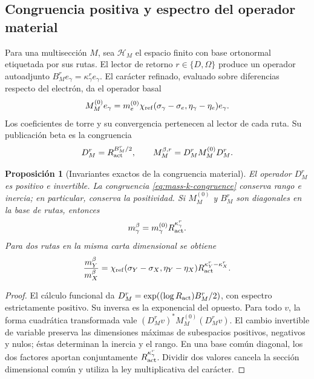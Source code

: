 \documentclass[a4paper,10pt]{article}
\newtheorem{proposition}[theorem]{Proposición}
\theoremstyle{definition}\newtheorem{definition}[theorem]{Definición}
\theoremstyle{remark}\newtheorem{remark}[theorem]{Observación}
\numberwithin{equation}{section}
\begin{document}
\subsection{Congruencia positiva y espectro del operador material}

Para una multisección \(M\), sea \(\mathscr H_M\) el espacio finito
con base ortonormal etiquetada por sus rutas. El lector de retorno
\(r\in\{D,\Omega\}\) produce un operador autoadjunto
\(B_M^r e_\gamma=\kappa_\gamma^r e_\gamma\). El carácter refinado,
evaluado sobre diferencias respecto del electrón, da el operador basal
\[
 M_M^{(0)}e_\gamma=
 m_e^{(0)}\chi_{\rm ref}(\sigma_\gamma-\sigma_e,
                  \eta_\gamma-\eta_e)e_\gamma.
\]
Los coeficientes de torre y su convergencia pertenecen al lector de cada
ruta. Su publicación beta es la congruencia
\begin{equation}
 D_M^r=R_{\rm act}^{B_M^r/2},\qquad
 M_M^{\beta,r}=D_M^rM_M^{(0)}D_M^r.
 \label{eq:mass-k-congruence}
\end{equation}

\begin{proposition}[Invariantes exactos de la congruencia material]
El operador \(D_M^r\) es positivo e invertible. La congruencia
\eqref{eq:mass-k-congruence} conserva rango e inercia; en particular,
conserva la positividad. Si \(M_M^{(0)}\) y \(B_M^r\) son diagonales
en la base de rutas, entonces
\[
 m_\gamma^\beta=m_\gamma^{(0)}R_{\rm act}^{\kappa_\gamma^r}.
\]
Para dos rutas en la misma carta dimensional se obtiene
\[
 \frac{m_Y^\beta}{m_X^\beta}=
 \chi_{\rm ref}(\sigma_Y-\sigma_X,\eta_Y-\eta_X)
 R_{\rm act}^{\kappa_Y^r-\kappa_X^r}.
\]
\end{proposition}
\begin{proof}
El cálculo funcional da
\(D_M^r=\exp((\log R_{\rm act})B_M^r/2)\), con espectro
estrictamente positivo. Su inversa es la exponencial del opuesto.
Para todo \(v\), la forma cuadrática transformada vale
\((D_M^rv)^*M_M^{(0)}(D_M^rv)\). El cambio invertible de variable
preserva las dimensiones máximas de subespacios positivos, negativos
y nulos; éstas determinan la inercia y el rango. En una base común
diagonal, los dos factores aportan conjuntamente
\(R_{\rm act}^{\kappa_\gamma^r}\). Dividir dos valores cancela
la sección dimensional común y utiliza la ley multiplicativa del
carácter.
\end{proof}
\end{document}
